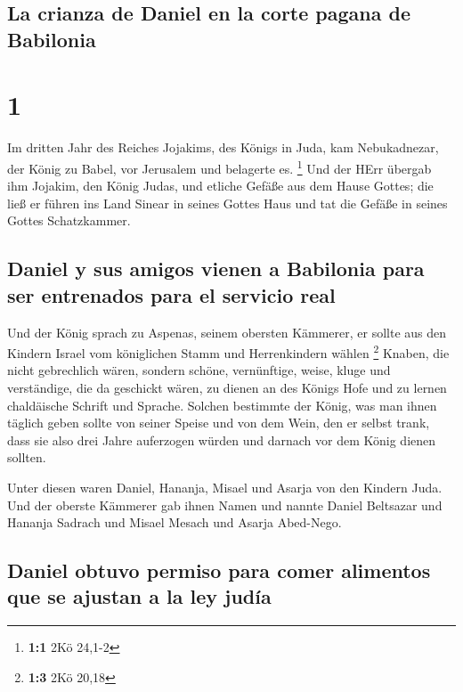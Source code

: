 \hypertarget{la-crianza-de-daniel-en-la-corte-pagana-de-babilonia}{%
\subsection{La crianza de Daniel en la corte pagana de
Babilonia}\label{la-crianza-de-daniel-en-la-corte-pagana-de-babilonia}}

\hypertarget{section}{%
\section{1}\label{section}}

 Im dritten Jahr des Reiches Jojakims, des Königs in Juda,
kam Nebukadnezar, der König zu Babel, vor Jerusalem und belagerte es.
\footnote{\textbf{1:1} 2Kö 24,1-2}  Und der HErr übergab
ihm Jojakim, den König Judas, und etliche Gefäße aus dem Hause Gottes;
die ließ er führen ins Land Sinear in seines Gottes Haus und tat die
Gefäße in seines Gottes Schatzkammer.

\hypertarget{daniel-y-sus-amigos-vienen-a-babilonia-para-ser-entrenados-para-el-servicio-real}{%
\subsection{Daniel y sus amigos vienen a Babilonia para ser entrenados
para el servicio
real}\label{daniel-y-sus-amigos-vienen-a-babilonia-para-ser-entrenados-para-el-servicio-real}}

 Und der König sprach zu Aspenas, seinem obersten
Kämmerer, er sollte aus den Kindern Israel vom königlichen Stamm und
Herrenkindern wählen \footnote{\textbf{1:3} 2Kö 20,18} 
Knaben, die nicht gebrechlich wären, sondern schöne, vernünftige, weise,
kluge und verständige, die da geschickt wären, zu dienen an des Königs
Hofe und zu lernen chaldäische Schrift und Sprache. 
Solchen bestimmte der König, was man ihnen täglich geben sollte von
seiner Speise und von dem Wein, den er selbst trank, dass sie also drei
Jahre auferzogen würden und darnach vor dem König dienen sollten.

 Unter diesen waren Daniel, Hananja, Misael und Asarja von
den Kindern Juda.  Und der oberste Kämmerer gab ihnen
Namen und nannte Daniel Beltsazar und Hananja Sadrach und Misael Mesach
und Asarja Abed-Nego.

\hypertarget{daniel-obtuvo-permiso-para-comer-alimentos-que-se-ajustan-a-la-ley-juduxeda}{%
\subsection{Daniel obtuvo permiso para comer alimentos que se ajustan a
la ley
judía}\label{daniel-obtuvo-permiso-para-comer-alimentos-que-se-ajustan-a-la-ley-juduxeda}}

